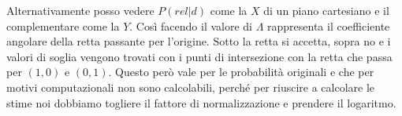 Alternativamente posso vedere $P(rel|d)$ come la $X$ di un piano cartesiano e il complementare come la $Y$. 
Così facendo il valore di $\Lambda$ rappresenta il coefficiente angolare della retta passante per l'origine. Sotto la retta si accetta, sopra no e i valori di soglia vengono trovati con i punti di intersezione con la retta che passa per $(1,0)$ e $(0,1)$.
Questo però vale per le probabilità originali e che per motivi computazionali non sono calcolabili, perché per riuscire a calcolare le stime noi dobbiamo togliere il fattore di normalizzazione e prendere il logaritmo.


